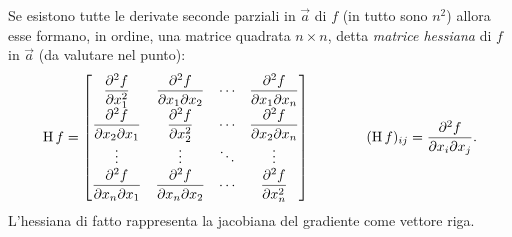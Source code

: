 Se esistono tutte le derivate seconde parziali in $\vec a$ di $f$ (in tutto sono $n^2$) allora esse formano, in ordine, una matrice quadrata $n\times n$, detta \emph{matrice hessiana} di $f$ in $\vec a$ (da valutare nel punto):
\[
\operatorname{H} f=\begin{bmatrix}
\dfrac{\partial^2f}{\partial x_1^2}		&\dfrac{\partial^2f}{\partial x_1\partial x_2}	&\cdots 	&\dfrac{\partial^2f}{\partial x_1\partial x_n}\\
\dfrac{\partial^2f}{\partial x_2\partial x_1}	&\dfrac{\partial^2f}{\partial x_2^2}		&\cdots 	&\dfrac{\partial^2f}{\partial x_2\partial x_n}\\
\vdots 							&\vdots 							&\ddots 	&\vdots\\
\dfrac{\partial^2f}{\partial x_n\partial x_1}	&\dfrac{\partial^2f}{\partial x_n\partial x_2}	&\cdots 	&\dfrac{\partial^2f}{\partial x_n^2}
\end{bmatrix}\qquad\qquad(\operatorname{H} f)_{ij}=\dfrac{\partial^2f}{\partial x_i\partial x_j}.
\]
L'hessiana di fatto rappresenta la jacobiana del gradiente come vettore riga.

